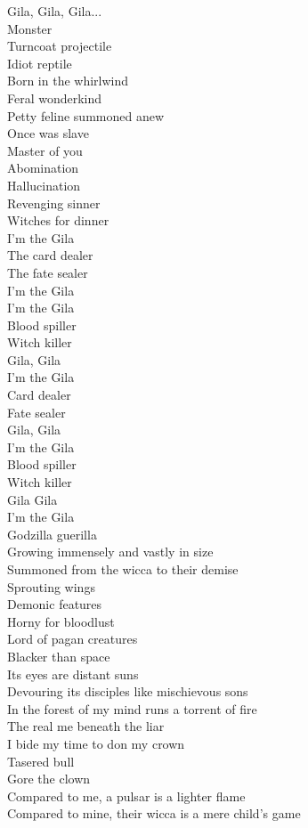 Gila, Gila, Gila...\\
Monster\\

Turncoat projectile\\
Idiot reptile\\
Born in the whirlwind\\
Feral wonderkind\\
Petty feline summoned anew\\
Once was slave\\
Master of you\\
Abomination\\
Hallucination\\
Revenging sinner\\
Witches for dinner\\
I'm the Gila\\
The card dealer\\
The fate sealer\\
I'm the Gila\\

I'm the Gila\\
Blood spiller\\
Witch killer\\
Gila, Gila\\
I'm the Gila\\
Card dealer\\
Fate sealer\\
Gila, Gila\\
I'm the Gila\\
Blood spiller\\
Witch killer\\
Gila Gila\\
I'm the Gila\\
Godzilla guerilla\\

Growing immensely and vastly in size\\
Summoned from the wicca to their demise\\
Sprouting wings\\
Demonic features\\
Horny for bloodlust\\
Lord of pagan creatures\\
Blacker than space\\
Its eyes are distant suns\\
Devouring its disciples like mischievous sons\\
In the forest of my mind runs a torrent of fire\\
The real me beneath the liar\\
I bide my time to don my crown\\
Tasered bull\\
Gore the clown\\
Compared to me, a pulsar is a lighter flame\\
Compared to mine, their wicca is a mere child's game\\

